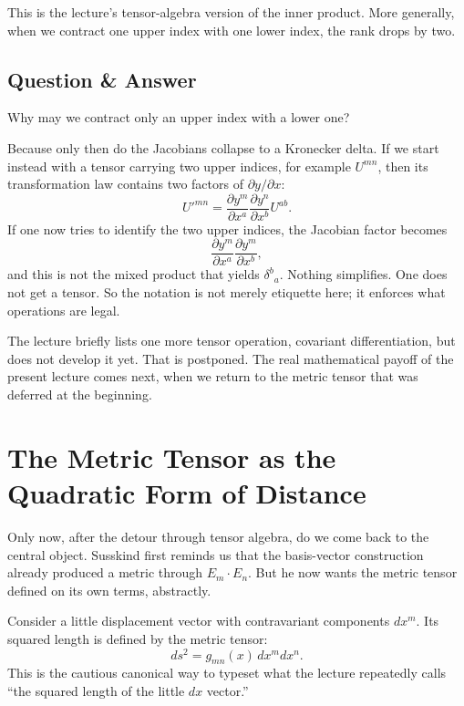 This is the lecture's tensor-algebra version of the inner product. More generally, when we contract one upper index with one lower index, the rank drops by two.

\subsection{Question \& Answer}

Why may we contract only an upper index with a lower one?

Because only then do the Jacobians collapse to a Kronecker delta. If we start instead with a tensor carrying two upper indices, for example \(U^{mn}\), then its transformation law contains two factors of \(\partial y/\partial x\):
\begin{equation}
U'^{mn}
=
\frac{\partial y^m}{\partial x^a}
\frac{\partial y^n}{\partial x^b}
U^{ab}.
\end{equation}
If one now tries to identify the two upper indices, the Jacobian factor becomes
\begin{equation}
\frac{\partial y^m}{\partial x^a}
\frac{\partial y^m}{\partial x^b},
\end{equation}
and this is not the mixed product that yields \(\delta^b{}_a\). Nothing simplifies. One does not get a tensor. So the notation is not merely etiquette here; it enforces what operations are legal.

The lecture briefly lists one more tensor operation, covariant differentiation, but does not develop it yet. That is postponed. The real mathematical payoff of the present lecture comes next, when we return to the metric tensor that was deferred at the beginning.

\section{The Metric Tensor as the Quadratic Form of Distance}

Only now, after the detour through tensor algebra, do we come back to the central object. Susskind first reminds us that the basis-vector construction already produced a metric through \(E_m\cdot E_n\). But he now wants the metric tensor defined on its own terms, abstractly.

Consider a little displacement vector with contravariant components \(dx^m\). Its squared length is defined by the metric tensor:
\begin{equation}
ds^2 = g_{mn}(x)\,dx^m dx^n.
\end{equation}
This is the cautious canonical way to typeset what the lecture repeatedly calls ``the squared length of the little \(dx\) vector.''

